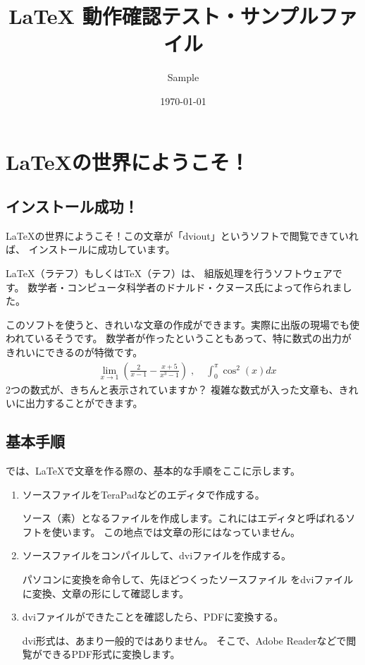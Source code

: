 \documentclass[a4j,12pt]{jreport}
\title{ {\LaTeX} 動作確認テスト・サンプルファイル}
\author{Sample}
\date{\today}
\begin{document}
\maketitle


\chapter{\LaTeX の世界にようこそ！}

\section{インストール成功！}
\LaTeX の世界にようこそ！この文章が「dviout」というソフトで閲覧できていれば、
インストールに成功しています。

\LaTeX（ラテフ）もしくは\TeX（テフ）は、
組版処理を行うソフトウェアです。
数学者・コンピュータ科学者のドナルド・クヌース氏によって作られました。

このソフトを使うと、きれいな文章の作成ができます。実際に出版の現場でも使われているそうです。
数学者が作ったということもあって、特に数式の出力がきれいにできるのが特徴です。
\begin{eqnarray}
& \displaystyle \lim _{x \rightarrow 1} \left( \frac{2}{x-1} - \frac{x+5}{x^3 -1} \right)\; ,\; 
& \displaystyle \int ^\pi _0 \cos ^2 (x)dx \nonumber
\end{eqnarray}
2つの数式が、きちんと表示されていますか？
複雑な数式が入った文章も、きれいに出力することができます。



\section{基本手順}

では、\LaTeX で文章を作る際の、基本的な手順をここに示します。


\begin{enumerate}
 \item ソースファイルをTeraPadなどのエディタで作成する。
 
 ソース（素）となるファイルを作成します。これにはエディタと呼ばれるソフトを使います。
 この地点では文章の形にはなっていません。
 
 \item ソースファイルをコンパイルして、dviファイルを作成する。
 
 パソコンに変換を命令して、先ほどつくったソースファイル
 をdviファイルに変換、文章の形にして確認します。
 
 \item dviファイルができたことを確認したら、PDFに変換する。
 
 dvi形式は、あまり一般的ではありません。
 そこで、Adobe Readerなどで閲覧ができるPDF形式に変換します。
 
 
\end{enumerate}
\end{document}
